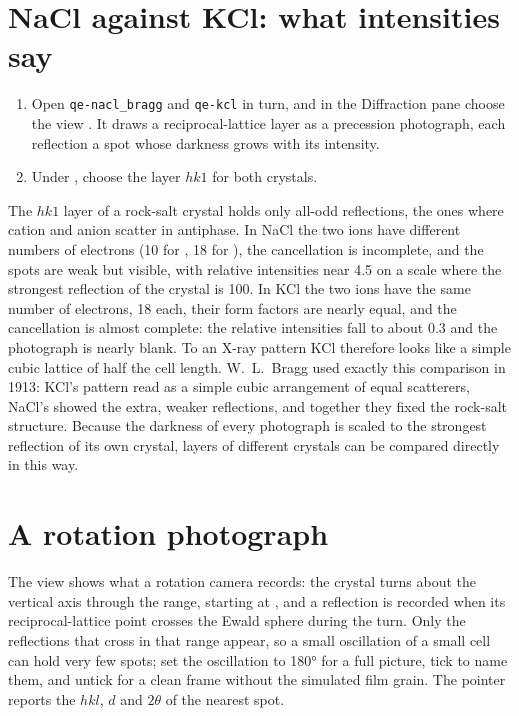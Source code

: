\section{NaCl against KCl: what intensities say}
\begin{enumerate}
	\item Open \texttt{qe-nacl\_bragg} and \texttt{qe-kcl} in turn, and in the Diffraction pane choose the view . It draws a reciprocal-lattice layer as a precession photograph, each reflection a spot whose darkness grows with its intensity.
	\item Under , choose the layer $hk1$ for both crystals.
\end{enumerate}
The $hk1$ layer of a rock-salt crystal holds only all-odd reflections, the ones where cation and anion scatter in antiphase. In NaCl the two ions have different numbers of electrons (10 for , 18 for ), the cancellation is incomplete, and the spots are weak but visible, with relative intensities near 4.5 on a scale where the strongest reflection of the crystal is 100. In KCl the two ions have the same number of electrons, 18 each, their form factors are nearly equal, and the cancellation is almost complete: the relative intensities fall to about 0.3 and the photograph is nearly blank. To an X-ray pattern KCl therefore looks like a simple cubic lattice of half the cell length. W.~L.~Bragg used exactly this comparison in 1913: KCl's pattern read as a simple cubic arrangement of equal scatterers, NaCl's showed the extra, weaker reflections, and together they fixed the rock-salt structure. Because the darkness of every photograph is scaled to the strongest reflection of its own crystal, layers of different crystals can be compared directly in this way.

\section{A rotation photograph}
The  view shows what a rotation camera records: the crystal turns about the vertical axis through the  range, starting at , and a reflection is recorded when its reciprocal-lattice point crosses the Ewald sphere during the turn. Only the reflections that cross in that range appear, so a small oscillation of a small cell can hold very few spots; set the oscillation to 180° for a full picture, tick  to name them, and untick  for a clean frame without the simulated film grain. The pointer reports the $hkl$, $d$ and $2\theta$ of the nearest spot.


